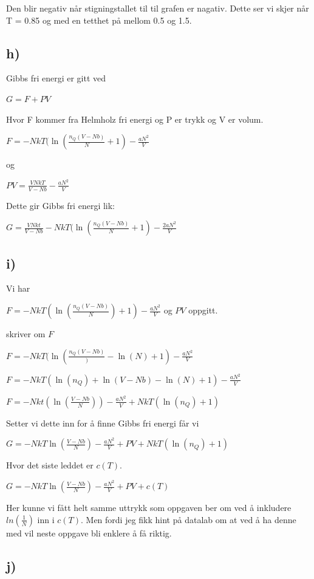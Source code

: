 \documentclass[12pt]{article}
\begin{document}
Den blir negativ når stigningstallet til til grafen er nagativ. Dette ser vi skjer når T = 0.85 og med en tetthet på mellom 0.5 og 1.5. 

\subsection*{h)}
Gibbs fri energi er gitt ved 

$G = F + PV$

Hvor F kommer fra Helmholz fri energi og P er trykk og V er volum. 

$F = - NkT(\ln(\frac{n_Q(V -Nb)}{N} + 1) - \frac{aN^2}{V}$

og 

$PV = \frac{VNkT}{V- Nb} - \frac{aN^2}{V}$

Dette gir Gibbs fri energi lik: 

$G = \frac{VNkt}{V - Nb} - NkT(\ln(\frac{n_Q(V-Nb)}{N} + 1) - \frac{2aN^2}{V}$

\subsection*{i)}

Vi har 

$F = - NkT(\ln(\frac{n_Q(V -Nb)}{N}) + 1) - \frac{aN^2}{V}$ og $PV$ oppgitt. 

skriver om $F$ 

$F = - NkT(\ln(\frac{n_Q(V -Nb)}) - \ln(N) + 1) - \frac{aN^2}{V}$

$F = -NkT(\ln(n_Q) + \ln(V-Nb) - \ln(N) + 1) - \frac{aN^2}{V}$ 

$F = -Nkt(\ln(\frac{V- Nb}{N})) - \frac{aN^2}{V} +NkT(\ln(n_Q) +1)$ 

Setter vi dette inn for å finne Gibbs fri energi får vi 

$G = -NkT\ln(\frac{V-Nb}{N}) - \frac{aN^2}{V} + PV  + NkT(\ln(n_Q) +1)$

Hvor det siste leddet er $c(T)$. 

$G = -NkT\ln(\frac{V-Nb}{N}) - \frac{aN^2}{V} + PV  + c(T)$

Her kunne vi fått helt samme uttrykk som oppgaven ber om ved å inkludere $ln(\frac{1}{N})$ inn i $c(T)$. Men fordi jeg fikk hint på datalab om at ved å ha denne med vil neste oppgave bli enklere å få riktig.

\subsection*{j)}
\end{document}
